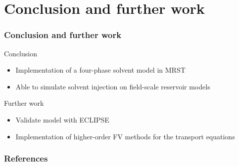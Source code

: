 \documentclass[screen, aspectratio=43]{beamer}
\begin{document}
\begin{frame}
{\begin{figure}[h]
    \end{figure}
  }
\end{frame}

\section{Conclusion and further work}

\begin{frame}
  \frametitle{Conclusion and further work}
  Conclusion
  \begin{itemize}
  \item Implementation of a four-phase solvent model in MRST
  \item Able to simulate solvent injection on field-scale reservoir models
  \end{itemize}
  Further work
  \begin{itemize}
  \item Validate model with ECLIPSE
  \item Implementation of higher-order FV methods for the transport equations
  \end{itemize}
\end{frame}

\begin{frame}
  \frametitle{References}
  \begin{scriptsize}
    
  \end{scriptsize}
\end{frame}
\end{document}
